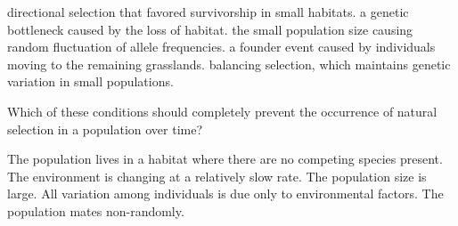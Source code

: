 \begin{choices}
\choice directional selection that favored survivorship in small habitats. 
\correctchoice a genetic bottleneck caused by the loss of habitat. 
\choice the small population size causing random fluctuation of allele frequencies. 
\choice a founder event caused by individuals moving to the remaining grasslands. 
\choice balancing selection, which maintains genetic variation in small populations. 
\end{choices}

\question
Which of these conditions should completely prevent the occurrence of natural selection in a population over time?

\begin{choices}
\choice The population lives in a habitat where there are no competing species present. 
\choice The environment is changing at a relatively slow rate. 
\choice The population size is large. 
\correctchoice All variation among individuals is due only to environmental factors. 
\choice The population mates non-randomly.
\end{choices}
